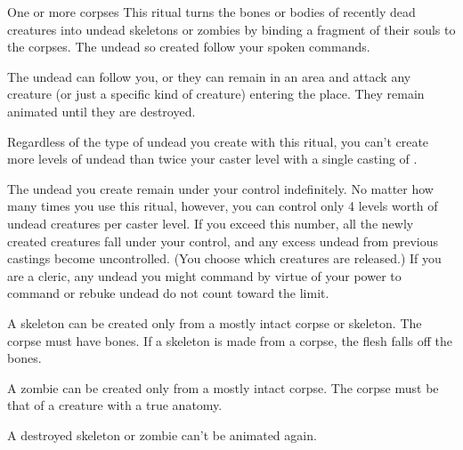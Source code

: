 \begin{spelltarget}{One or more corpses}
    \spelleffect This ritual turns the bones or bodies of recently dead creatures into undead skeletons or zombies by binding a fragment of their souls to the corpses. The undead so created follow your spoken commands.
    \par The undead can follow you, or they can remain in an area and attack any creature (or just a specific kind of creature) entering the place. They remain animated until they are destroyed.
    \par Regardless of the type of undead you create with this ritual, you can't create more levels of undead than twice your caster level with a single casting of .
    \par The undead you create remain under your control indefinitely. No matter how many times you use this ritual, however, you can control only 4 levels worth of undead creatures per caster level. If you exceed this number, all the newly created creatures fall under your control, and any excess undead from previous castings become uncontrolled. (You choose which creatures are released.) If you are a cleric, any undead you might command by virtue of your power to command or rebuke undead do not count toward the limit.
    \par {} A skeleton can be created only from a mostly intact corpse or skeleton. The corpse must have bones. If a skeleton is made from a corpse, the flesh falls off the bones.
    \par {} A zombie can be created only from a mostly intact corpse. The corpse must be that of a creature with a true anatomy.
\end{spelltarget}
\spellnotes A destroyed skeleton or zombie can't be animated again.

